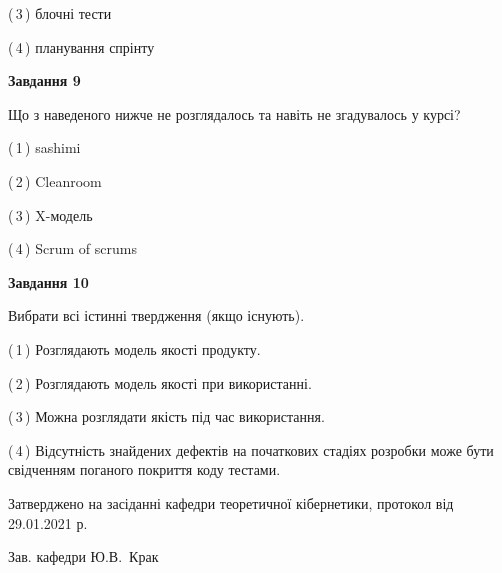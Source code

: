\documentclass[10pt, ukrainian]{article}
\begin{document}
{\begin {large}
(\,3\,) блочні тести%



(\,4\,) планування спрінту%


{\begin {center}\textbf{Завдання 9}\end {center}}\par
Що з наведеного нижче не розглядалось та навіть не згадувалось у курсі?\par
\vspace{2mm}



(\,1\,) sashimi%



(\,2\,) Cleanroom%



(\,3\,) X-модель%



(\,4\,) Scrum of scrums%


{\begin {center}\textbf{Завдання 10}\end {center}}\par
Вибрати всі істинні твердження (якщо існують).\par
\vspace{2mm}



(\,1\,) Розглядають модель якості продукту.%



(\,2\,) Розглядають модель якості при використанні.%



(\,3\,) Можна розглядати якість під час використання.%



(\,4\,) Відсутність знайдених дефектів на початкових стадіях розробки може бути свідченням поганого покриття коду тестами.%



\end {large}}
{\vspace{5mm}\smallskip \begin {small} Затверджено на засіданні кафедри теоретичної кібернетики, протокол  від   29.01.2021 р.\par\smallskip\smallskip
{\parbox {6.5 cm}{Зав. кафедри \dotfill Ю.В.~Крак}} \end{small}}
\newpage
\end{document}
